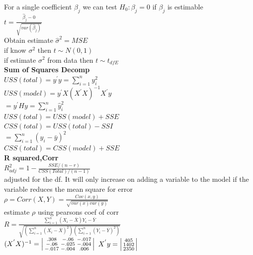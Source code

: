 \documentclass[10pt,landscape]{article}
\newenvironment{lsmallmatrix}
{\left|\begin{smallmatrix}}
	{\end{smallmatrix}\right|}
\newcommand{\B}{\beta}
\newcommand{\sg}{\sigma}
\newcommand{\hb}{\hat{\beta}}
\newcommand{\sumn}{\sum_{i=1}^{n}}
\begin{document}
\begin{multicols*}{4}
For a single coefficient $\B_j$ we can test $H_0:\B_j=0$ if $\B_j$ is estimable\\
$t=\frac{\hb_j-0}{\sqrt{var(\hb_j)}}$\\
Obtain estimate $\hat{\sg}^2=MSE$\\
if know $\sigma^2$  then $t\sim N(0,1)$\\
if estimate $\sg^2$ from data then $t\sim t_{dfE}$\\
\textbf{Sum of Squares Decomp}\\
$USS(total)=y^{'}y=\sumn y_i^2$\\
$USS(model)=y^{'}X(X^{'}X)^{-1}X^{'}y$\\
$=y^{'}Hy=\sumn \hat{y}_i^2$\\
$USS(total)=USS(model)+SSE$\\
$CSS(total)=USS(total)-SSI$\\
$=\sumn(y_i-\bar{y})^2$\\
$CSS(total)=CSS(model)+SSE$\\
\textbf{R squared,Corr}\\
$R^2_{adj}=1-\frac{SSE/(n-r)}{CSS(Total)/(n-1)}$\\
 adjusted for the df. It will only increase on
adding a variable to the model if the variable reduces the mean square
for error\\
$\rho=Corr(X,Y)=\frac{Cov(x,y)}{\sqrt{var(x)var(y)}}$\\
estimate $\rho$ using pearsons coef of corr\\
$R=\frac{\sumn(X_i-\bar{X})Y_i-\bar{Y}}{\sqrt{(\sumn
(X_i-\bar{X})^2)(\sumn (Y_i-\bar{Y})^2)}}$\\
$(X^{'}X)^{-1}=\begin{lsmallmatrix}
.308&-.06&-.017\\
-.06&-.025&-.004\\
-.017&-.004&.006
\end{lsmallmatrix}$ $X^{'}y=\begin{lsmallmatrix}
405\\1402\\2350
\end{lsmallmatrix}$\\
\end{multicols*}
\end{document}
